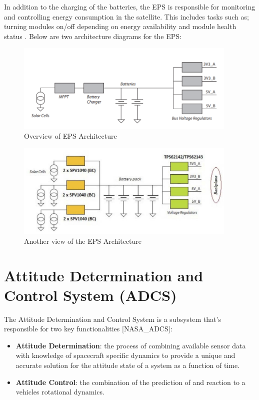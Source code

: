 \documentclass[12pt, a4paper]{report}
\begin{document}
In addition to the charging of the batteries, the EPS is responsible for monitoring and controlling energy consumption in the satellite. This includes tasks such as; turning modules on/off depending on energy availability and module health status \cite{overview}. Below are two architecture diagrams for the EPS:

\begin{figure}[H]
    \centering
    \includegraphics[width=300pt]{images/eps_1.PNG}
    \caption{Overview of EPS Architecture \cite{power_distribution}}
    \label{fig:eps_1}
\end{figure}

\begin{figure}[H]
    \centering
    \includegraphics[width=300pt]{images/eps_2.PNG}
    \caption{Another view of the EPS Architecture \cite{overview}}
    \label{fig:eps_2}
\end{figure}

\section{Attitude Determination and Control System (ADCS)}

The Attitude Determination and Control System is a subsystem that's responsible for two key functionalities [NASA\_ADCS]:

\begin{itemize}
    \item \textbf{Attitude Determination}: the process of combining available sensor data with knowledge of spacecraft specific dynamics to provide a unique and accurate solution for the attitude state of a system as a function of time.
    \item \textbf{Attitude Control}: the combination of the prediction of and reaction to a vehicles rotational dynamics.
\end{itemize}
\end{document}
